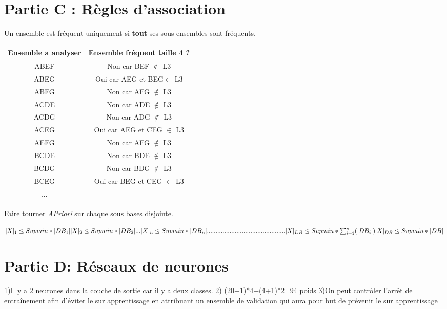 \documentclass[a4paper,11pt]{article}
\begin{document}
\section{Partie C : Règles d'association}
Un ensemble est fréquent uniquement si \textbf{tout} ses sous ensembles sont fréquents.

\begin{center}
\begin{tabular}{|c|c|}
\hline 
Ensemble a analyser & Ensemble fréquent taille 4 ? \\ 
\hline 
ABEF & Non car BEF $\notin$ L3 \\ 
\hline 
ABEG & Oui car AEG et BEG$\in$ L3 \\ 
\hline 
ABFG & Non car AFG $\notin$ L3 \\ 
\hline 
ACDE & Non car ADE  $\notin$ L3 \\ 
\hline 
ACDG & Non car ADG $\notin$ L3 \\ 
\hline 
ACEG & Oui car AEG et CEG $\in$ L3 \\ 
\hline 
AEFG & Non car AFG $\notin$ L3 \\ 
\hline 
BCDE & Non car BDE $\notin$ L3 \\ 
\hline 
BCDG & Non car BDG $\notin$ L3 \\ 
\hline 
BCEG & Oui car BEG et CEG $\in$ L3 \\ 
\hline 
... &  \\ 
\hline 
\end{tabular} 
\end{center}


Faire tourner \emph{APriori} sur chaque sous bases disjointe.

$
\\
|X|_1 \leq Supmin * |DB_1|\\
|X|_2 \leq Supmin * |DB_2|\\
...\\
|X|_n \leq Supmin * |DB_n|\\
.............................................\\
|X|_{DB} \leq Supmin * \sum_{i=1}^{n}(|DB_i|)\\
|X|_{DB} \leq Supmin * |DB|
$

\section{Partie D: Réseaux de neurones}
1)Il y a 2 neurones dans la couche de sortie car il y a deux classes.
2) (20+1)*4+(4+1)*2=94 poids
3)On peut contrôler l’arrêt de entraînement afin d'éviter le sur apprentissage en attribuant un ensemble de validation qui aura pour but de prévenir le sur apprentissage
\end{document}
